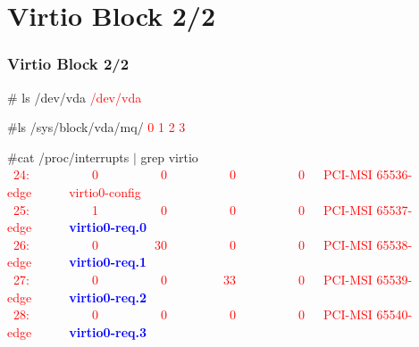 \documentclass[aspectratio=169]{beamer}
\begin{document}
\section{Virtio Block 2/2}
\begin{frame}
\frametitle{Virtio Block 2/2}
\begin{block}{}
\# ls /dev/vda \newline
\textcolor{red}{/dev/vda} \newline

\#ls /sys/block/vda/mq/ \newline
\textcolor{red}{0 1 2 3} \newline

\#cat /proc/interrupts $|$ grep virtio \newline
\textcolor{red}{\ 24:\ \ \ \ \ \ \ \ \ \ 0\ \ \ \ \ \ \ \ \ \ 0\ \ \ \ \ \ \ \ \ \ 0\ \ \ \ \ \ \ \ \ \ 0\ \ \ PCI-MSI 65536-edge\ \ \ \ \ \ virtio0-config} \newline
\textcolor{red}{\ 25:\ \ \ \ \ \ \ \ \ \ 1\ \ \ \ \ \ \ \ \ \ 0\ \ \ \ \ \ \ \ \ \ 0\ \ \ \ \ \ \ \ \ \ 0\ \ \ PCI-MSI 65537-edge\ \ \ \ \ \ \textbf{\textcolor{blue}{virtio0-req.0}}} \newline
\textcolor{red}{\ 26:\ \ \ \ \ \ \ \ \ \ 0\ \ \ \ \ \ \ \ \ 30\ \ \ \ \ \ \ \ \ \ 0\ \ \ \ \ \ \ \ \ \ 0\ \ \ PCI-MSI 65538-edge\ \ \ \ \ \ \textbf{\textcolor{blue}{virtio0-req.1}}} \newline
\textcolor{red}{\ 27:\ \ \ \ \ \ \ \ \ \ 0\ \ \ \ \ \ \ \ \ \ 0\ \ \ \ \ \ \ \ \ 33\ \ \ \ \ \ \ \ \ \ 0\ \ \ PCI-MSI 65539-edge\ \ \ \ \ \ \textbf{\textcolor{blue}{virtio0-req.2}}} \newline
\textcolor{red}{\ 28:\ \ \ \ \ \ \ \ \ \ 0\ \ \ \ \ \ \ \ \ \ 0\ \ \ \ \ \ \ \ \ \ 0\ \ \ \ \ \ \ \ \ \ 0\ \ \ PCI-MSI 65540-edge\ \ \ \ \ \ \textbf{\textcolor{blue}{virtio0-req.3}}}
\end{block}
\end{frame}

\end{document}
